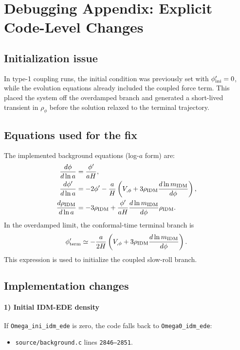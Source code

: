\documentclass[aps,onecolumn,prd,nofootinbib,superscriptaddress,10pt,longbibliography,floatfix]{revtex4-2}
\begin{document}
\appendix
\section{Debugging Appendix: Explicit Code-Level Changes}
\subsection{Initialization issue}
In type-1 coupling runs, the initial condition was previously set with $\phi'_{\rm ini}=0$, while the evolution equations already included the coupled force term. This placed the system off the overdamped branch and generated a short-lived transient in $\rho_\phi$ before the solution relaxed to the terminal trajectory.

\subsection{Equations used for the fix}
The implemented background equations (log-$a$ form) are:
\begin{align}
\frac{d\phi}{d\ln a} &= \frac{\phi'}{aH},\\
\frac{d\phi'}{d\ln a} &=
-2\phi' - \frac{a}{H}\left(V_{,\phi}+3\rho_{\rm IDM}\frac{d\ln m_{\rm IDM}}{d\phi}\right),\\
\frac{d\rho_{\rm IDM}}{d\ln a} &=
-3\rho_{\rm IDM}
+\frac{\phi'}{aH}\frac{d\ln m_{\rm IDM}}{d\phi}\rho_{\rm IDM}.
\end{align}
In the overdamped limit, the conformal-time terminal branch is
\begin{equation}
\phi'_{\rm term}\simeq -\frac{a}{2H}\left(V_{,\phi}+3\rho_{\rm IDM}\frac{d\ln m_{\rm IDM}}{d\phi}\right).
\label{eq:terminal}
\end{equation}
This expression is used to initialize the coupled slow-roll branch.

\subsection{Implementation changes}
\paragraph{1) Initial IDM-EDE density}
If \texttt{Omega\_ini\_idm\_ede} is zero, the code falls back to \texttt{Omega0\_idm\_ede}:
\begin{itemize}
\item \texttt{source/background.c} lines \texttt{2846--2851}.
\end{itemize}
\end{document}
